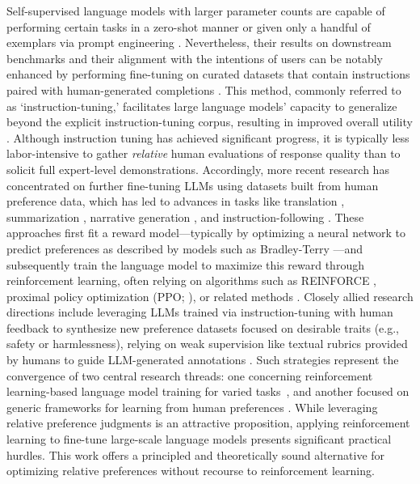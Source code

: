 Self-supervised language models with larger parameter counts are capable of performing certain tasks in a zero-shot manner \citep{radford2019language} or given only a handful of exemplars via prompt engineering \citep{gpt3,megatron,chowdhery2022palm}. Nevertheless, their results on downstream benchmarks and their alignment with the intentions of users can be notably enhanced by performing fine-tuning on curated datasets that contain instructions paired with human-generated completions \citep{mishra-etal-2022-cross,sanh2022multitask,chung2022scaling,thoppilan2022lamda}. This method, commonly referred to as `instruction-tuning,' facilitates large language models’ capacity to generalize beyond the explicit instruction-tuning corpus, resulting in improved overall utility \citep{chung2022scaling}. Although instruction tuning has achieved significant progress, it is typically less labor-intensive to gather \textit{relative} human evaluations of response quality than to solicit full expert-level demonstrations. Accordingly, more recent research has concentrated on further fine-tuning LLMs using datasets built from human preference data, which has led to advances in tasks like translation \citep{kreutzer-etal-2018-reliability}, summarization \citep{stiennon2022learning,ziegler2020finetuning}, narrative generation \citep{ziegler2020finetuning}, and instruction-following \citep{ouyang2022training,ramamurthy2023is}. These approaches first fit a reward model—typically by optimizing a neural network to predict preferences as described by models such as Bradley-Terry \citep{bradley1952rankanalysis}—and subsequently train the language model to maximize this reward through reinforcement learning, often relying on algorithms such as REINFORCE \citep{williams1992reinforce}, proximal policy optimization (PPO; \cite{schulman2017proximal}), or related methods \citep{ramamurthy2023is}. Closely allied research directions include leveraging LLMs trained via instruction-tuning with human feedback to synthesize new preference datasets focused on desirable traits (e.g., safety or harmlessness), relying on weak supervision like textual rubrics provided by humans to guide LLM-generated annotations \citep{bai2022constitutional}. Such strategies represent the convergence of two central research threads: one concerning reinforcement learning-based language model training for varied tasks~\citep{Ranzato2015SequenceLT,paulus2018a,wu2018learning}, and another focused on generic frameworks for learning from human preferences \citep{christiano2017deep,kupcsik2018learning}. While leveraging relative preference judgments is an attractive proposition, applying reinforcement learning to fine-tune large-scale language models presents significant practical hurdles. This work offers a principled and theoretically sound alternative for optimizing relative preferences without recourse to reinforcement learning.

